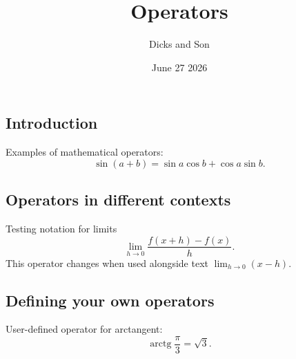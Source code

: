 \documentclass{article}
\title{Operators}
\author{Dicks and Son}
\date{June 27 2026}
\DeclareMathOperator{\arctg}{arctg}
\begin{document}
\maketitle
\subsection*{Introduction}
Examples of mathematical operators:
\[
\sin(a + b) = \sin a \cos b + \cos a \sin b
.\]

\subsection*{Operators in different contexts}
Testing notation for limits
\[
\lim_{h \to 0 } \frac{f(x+h)-f(x)}{h}
.\]
This operator changes when used alongside 
text \( \lim_{h \to 0} (x-h) \).
\subsection*{Defining your own operators}
User-defined operator for arctangent:
\[
\arctg \frac{\pi}{3} = \sqrt{3}
.\]
\end{document}
